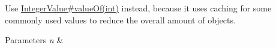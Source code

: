 
\begin{DoxyRefList}
\item[\label{deprecated__deprecated000001}%
\hypertarget{deprecated__deprecated000001}{}%
Member \hyperlink{classorg_1_1tzi_1_1use_1_1uml_1_1ocl_1_1value_1_1_integer_value_a2526919ff7627902a8ce6e1bc3c9393b}{org.tzi.use.uml.ocl.value.Integer\-Value.Integer\-Value} (int n)]Use \hyperlink{}{Integer\-Value\#value\-Of(int)} instead, because it uses caching for some commonly used values to reduce the overall amount of objects. 
\begin{DoxyParams}{Parameters}
{\em n} & \\
\hline
\end{DoxyParams}

\end{DoxyRefList}